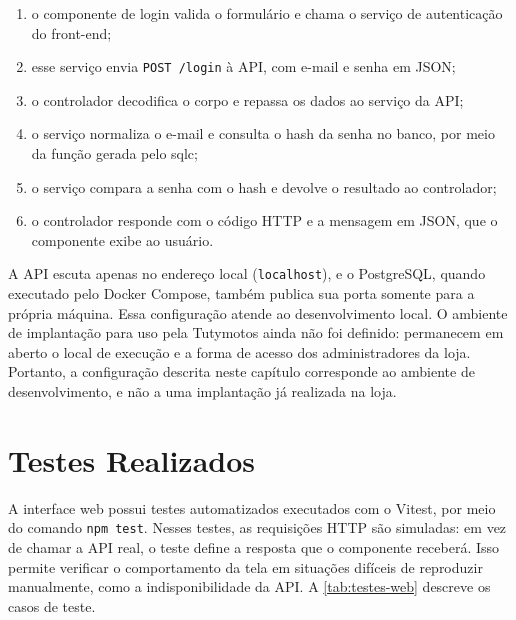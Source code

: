 \begin{enumerate}
  \item o componente de login valida o formulário e chama o serviço de autenticação do front-end;
  \item esse serviço envia \texttt{POST /login} à API, com e-mail e senha em JSON;
  \item o controlador decodifica o corpo e repassa os dados ao serviço da API;
  \item o serviço normaliza o e-mail e consulta o hash da senha no banco, por meio da função gerada pelo sqlc;
  \item o serviço compara a senha com o hash e devolve o resultado ao controlador;
  \item o controlador responde com o código HTTP e a mensagem em JSON, que o componente exibe ao usuário.
\end{enumerate}

A API escuta apenas no endereço local (\texttt{localhost}), e o PostgreSQL, quando executado pelo Docker Compose, também publica sua porta somente para a própria máquina. Essa configuração atende ao desenvolvimento local. O ambiente de implantação para uso pela Tutymotos ainda não foi definido: permanecem em aberto o local de execução e a forma de acesso dos administradores da loja. Portanto, a configuração descrita neste capítulo corresponde ao ambiente de desenvolvimento, e não a uma implantação já realizada na loja.

\section{Testes Realizados}
\label{sec:testes}

A interface web possui testes automatizados executados com o Vitest, por meio do comando \texttt{npm test}. Nesses testes, as requisições HTTP são simuladas: em vez de chamar a API real, o teste define a resposta que o componente receberá. Isso permite verificar o comportamento da tela em situações difíceis de reproduzir manualmente, como a indisponibilidade da API. A \autoref{tab:testes-web} descreve os casos de teste.

